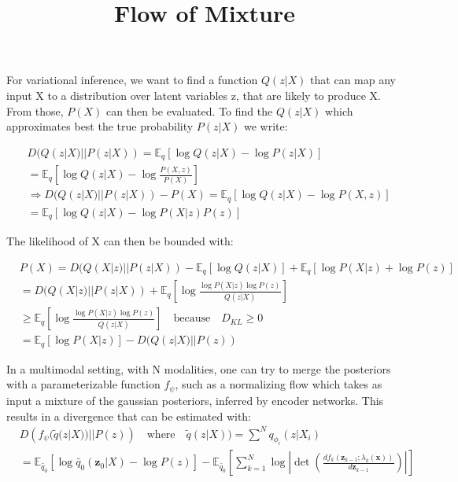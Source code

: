 \documentclass[11pt]{article}
\title{Flow of Mixture}
\date{}
\newcommand{\logposterior}{ \log Q(z|X)}
\begin{document}
    \maketitle
    For variational inference, we want to find a function $Q(z|X)$ that can map any input X to a distribution over latent
    variables z, that are likely to produce X.
    From those, $P(X)$ can then be evaluated.
    To find the $Q(z|X)$ which approximates best the true probability $P(z|X)$ we write:

    \begin{equation}
        \begin{split}
            & D(Q(z|X) || P(z|X)) = \mathbb{E}_q [\logposterior - \log P(z|X)]\\
            & = \mathbb{E}_q [\logposterior - \log \frac{P(X,z)}{P(X)}]\\
            & \Rightarrow D(Q(z|X) || P(z|X)) - P(X) = \mathbb{E}_q [\logposterior - \log P(X,z)]\\
            & = \mathbb{E}_q [\logposterior - \log P(X|z)P(z)]
        \end{split}
    \end{equation}

    The likelihood of X can then be bounded with:

    \begin{equation}
        \begin{split}
            & P(X) = D(Q(X|z) || P(z|X)) - \mathbb{E}_q [\logposterior] + \mathbb{E}_q [\log P(X|z)+\log P(z)]\\
            & = D(Q(X|z) || P(z|X)) + \mathbb{E}_q [\log \frac{\log P(X|z) \log P(z)}{Q(z|X) }]\\
            & \geq \mathbb{E}_q [\log \frac{\log P(X|z) \log P(z)}{Q(z|X) }] \quad \text{because} \quad D_{KL} \geq 0\\
            & = \mathbb{E}_q [\log P(X|z)] - D(Q(z|X) ||P(z))
        \end{split}
    \end{equation}

    In a multimodal setting, with N modalities, one can try to merge the posteriors with a parameterizable function
    $f_{\psi}$, such as a normalizing flow which takes as input a mixture of the gaussian posteriors, inferred by
    encoder networks.
    This results in a divergence that can be estimated with:
    \begin{equation}
        \begin{split}
            & D\left(f_{\psi}(\tilde{q}(z|X)) || P(z) \right) \quad \text{where} \quad \tilde{q}(z|X)) = \sum ^N q_{\phi_{i}} (z | X_i)\\
            &  = \mathbb{E}_{\tilde{q_{0}}} \left[ \log \tilde{q_{0}}(\textbf{z}_0|X) -\log P(z) \right] - \mathbb{E}_{\tilde{q_{0}}}\left[ \sum_{k=1}^{N} \log \left| \det \left( \frac{d f_k (\textbf{z}_{k-1}; \lambda_k (\textbf{x}))}{d\textbf{z}_{k-1}} \right) \right| \right]
        \end{split}
    \end{equation}
\end{document}
